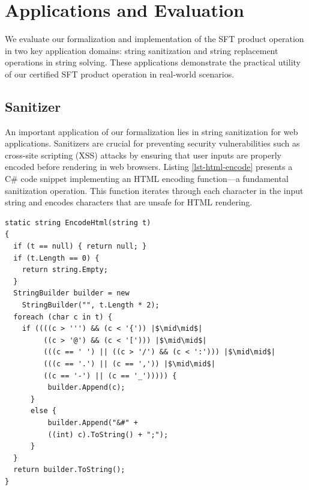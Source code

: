 \section{Applications and Evaluation}

We evaluate our formalization and implementation of the SFT product operation in two key application domains: string sanitization and string replacement operations in string solving. These applications demonstrate the practical utility of our certified SFT product operation in real-world scenarios.
\subsection{Sanitizer}

An important application of our formalization lies in string sanitization for web applications. Sanitizers are crucial for preventing security vulnerabilities such as cross-site scripting (XSS) attacks by ensuring that user inputs are properly encoded before rendering in web browsers. Listing \ref{lst-html-encode} presents a C\# code snippet implementing an HTML encoding function—a fundamental sanitization operation. This function iterates through each character in the input string and encodes characters that are unsafe for HTML rendering.



\begin{lstlisting}[language={[Sharp]C}, caption={C\# Code for AntiXSS.EncodeHtml version 2.0.}, label={lst-html-encode}, float=htbp]
static string EncodeHtml(string t)
{
  if (t == null) { return null; }
  if (t.Length == 0) {
    return string.Empty;
  }
  StringBuilder builder = new
    StringBuilder("", t.Length * 2);
  foreach (char c in t) {
    if ((((c > ''') && (c < '{')) |$\mid\mid$|
         ((c > '@') && (c < '['))) |$\mid\mid$|
         (((c == ' ') || ((c > '/') && (c < ':'))) |$\mid\mid$|
         (((c == '.') || (c == ',')) |$\mid\mid$|
         ((c == '-') || (c == '_'))))) {
          builder.Append(c);
      }
      else {
          builder.Append("&#" +
          ((int) c).ToString() + ";");
      }
  }
  return builder.ToString();
}
\end{lstlisting}

